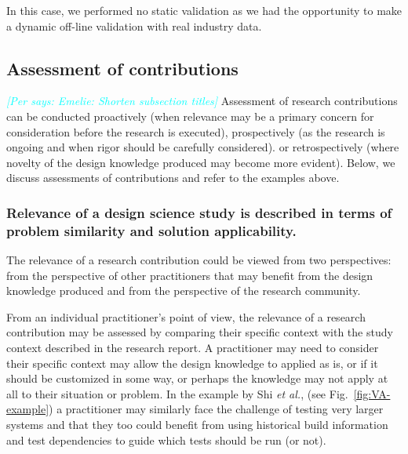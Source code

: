 \documentclass[graybox]{svmult}
\newcommand{\per}[1]{\textcolor{cyan}{{\it [Per says: #1]}}}
\newcommand{\per}[1]{}
\begin{document}
In this case, we performed no static validation as we had the opportunity to make a dynamic off-line validation with real industry data.



\subsection{Assessment of contributions}
\label{sec:assessment}

\per{Emelie: Shorten subsection titles}
Assessment of research contributions can be conducted proactively (when relevance may be a primary concern for consideration before the research is executed), prospectively (as the research is ongoing and when rigor should be carefully considered). or retrospectively (where novelty of the design knowledge produced may become more evident).
Below, we discuss assessments of contributions and refer to the examples above.




\subsubsection{Relevance of a design science study is described in terms of problem similarity and solution applicability.} 

The relevance of a research contribution could be viewed from two perspectives: from the perspective of other practitioners that may benefit from the design knowledge produced and from the perspective of the research community. 

From an individual practitioner's point of view, the relevance of a research contribution may be assessed by comparing their specific context with the study context described in the research report. 
A practitioner may need to consider their specific context may allow the design knowledge to applied as is, or if it should be customized in some way, or perhaps the knowledge may not apply at all to their situation or problem.
In the example by Shi \emph{et al.}, (see Fig.~\ref{fig:VA-example}) a practitioner may similarly face the challenge of testing very larger systems and  that they too could benefit from using historical build information and test dependencies to guide which tests should be run (or not).
\end{document}

